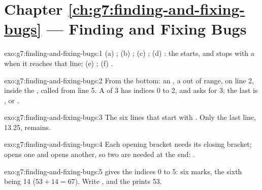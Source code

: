 \section*{Chapter \ref{ch:g7:finding-and-fixing-bugs} --- Finding and Fixing Bugs}

\begin{solution}{exo:g7:finding-and-fixing-bugs:1}
(a) ; (b) ; (c) ; (d) : the
 starts, and stops with a  when it reaches that line;
(e) ; (f) .
\end{solution}

\begin{solution}{exo:g7:finding-and-fixing-bugs:2}
From the bottom: an , a   out of range, on line 2,
inside the  , called from line 5. A  of 3  has
indices 0 to 2, and  asks for  3; the last
 is , or .
\end{solution}

\begin{solution}{exo:g7:finding-and-fixing-bugs:3}
The six lines that start with . Only the last line, 13.25,
remains.
\end{solution}

\begin{solution}{exo:g7:finding-and-fixing-bugs:4}
Each opening bracket needs its closing bracket;  opens one and
 opens another, so two are needed at the end:
.
\end{solution}

\begin{solution}{exo:g7:finding-and-fixing-bugs:5}
 gives the indices 0 to 5: six marks, the sixth being 14
($53 + 14 = 67$). Write , and the  prints 53.
\end{solution}

